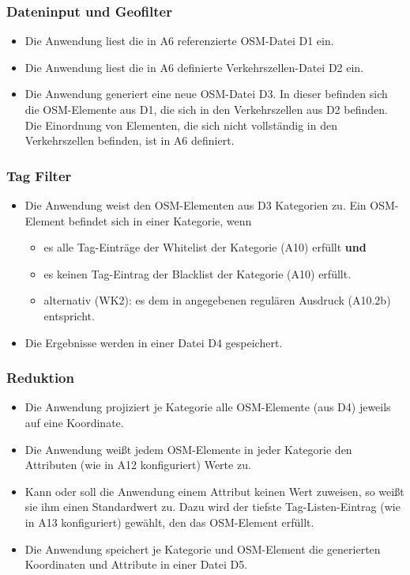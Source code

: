 \documentclass[parskip=full]{scrartcl} %
\begin{document}
\subsubsection*{Dateninput und Geofilter}
\begin{itemize}
    \item Die Anwendung liest die in A6 referenzierte OSM-Datei D1 ein.
    \item Die Anwendung liest die in A6 definierte Verkehrszellen-Datei D2 ein.
    \item Die Anwendung generiert eine neue OSM-Datei D3. In dieser befinden sich die OSM-Elemente aus D1, die sich in den Verkehrszellen aus D2 befinden. Die Einordnung von Elementen, die sich nicht vollständig in den Verkehrszellen befinden, ist in A6 definiert.
\end{itemize}


\subsubsection*{Tag Filter}
\begin{itemize}
    \item Die Anwendung weist den OSM-Elementen aus D3 Kategorien zu. Ein OSM-Element befindet sich in einer Kategorie, wenn
    \begin{itemize}
        \item es alle Tag-Einträge der Whitelist der Kategorie (A10) erfüllt \textbf{und}
        \item es keinen Tag-Eintrag der Blacklist der Kategorie (A10) erfüllt.
        \item alternativ (WK2): es dem in angegebenen regulären Ausdruck (A10.2b) entspricht.
    \end{itemize}
    \item Die Ergebnisse werden in einer Datei D4 gespeichert.
\end{itemize}


\subsubsection*{Reduktion}
\begin{itemize}
    \item Die Anwendung projiziert je Kategorie alle OSM-Elemente (aus D4) jeweils auf eine Koordinate.
    \item Die Anwendung weißt jedem OSM-Elemente in jeder Kategorie den Attributen (wie in A12 konfiguriert) Werte zu.
    \item Kann oder soll die Anwendung einem Attribut keinen Wert zuweisen, so weißt sie ihm einen Standardwert zu. Dazu wird der tiefste Tag-Listen-Eintrag (wie in A13 konfiguriert) gewählt, den das OSM-Element erfüllt.
    \item Die Anwendung speichert je Kategorie und OSM-Element die generierten Koordinaten und Attribute in einer Datei D5.
\end{itemize}
\end{document}
